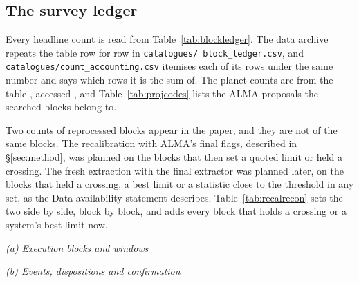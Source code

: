 \subsection{The survey ledger}

Every headline count is read from Table~\ref{tab:blockledger}. The data
archive repeats the table row for row in \texttt{catalogues/\allowbreak
block\_ledger.csv}, and \texttt{catalogues/\allowbreak count\_accounting.csv}
itemises each of its rows under the same number and says which rows it is
the sum of. The planet counts are
from the \SfHostCatalogue{} \SfHostTable{} table \citep{NEA2013}, accessed
\SfHostDate, and Table~\ref{tab:projcodes} lists the ALMA proposals the
searched blocks belong to. 

Two counts of reprocessed blocks appear in the paper, and they are not of
the same blocks. The recalibration with ALMA's final flags, described in
\S\ref{sec:method}, was planned on the blocks that then set a quoted limit or held a crossing.
The fresh extraction with the final extractor was planned later, on the
blocks that held a crossing, a best limit or a statistic close to the
threshold in any set, as the Data availability statement describes. Table~\ref{tab:recalrecon} sets
the two side by side, block by block, and adds every block that holds a
crossing or a system's best limit now.

\begin{table}
\centering
\scriptsize
\caption{\textbf{The survey ledger}: (a)~execution blocks and windows, hours
being window-hours, so the classes partition the hours as they partition the
windows; (b)~events, dispositions and confirmation. Each sub-row is a subset of the row its number extends. Note~d gives the
rule by which the counts of panel (a) sum.}
\label{tab:blockledger}
\textit{(a) Execution blocks and windows}\par\smallskip

\par\medskip
\textit{(b) Events, dispositions and confirmation}\par\smallskip

\end{table}

